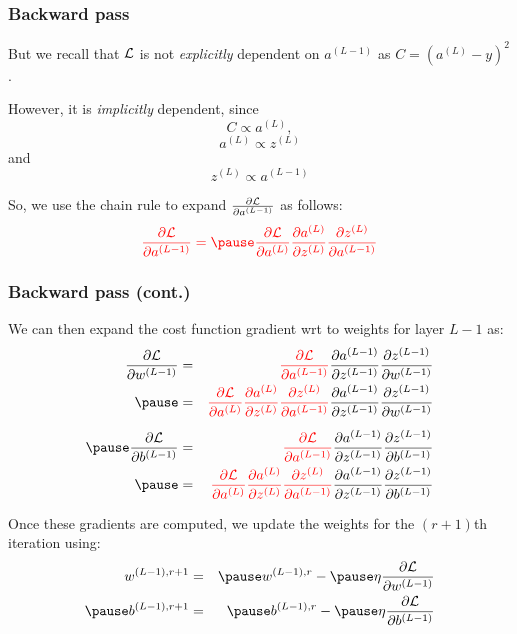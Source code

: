 \documentclass[smaller]{beamer}
\begin{document}
\begin{frame}
  \frametitle{Backward pass}
  \pause
  But we recall that $\mathcal{L}$ is not \textit{explicitly} dependent on $a^{(L-1)}$ as $C = (a^{(L)} - y)^2$.
  \pause

  However, it is \textit{implicitly} dependent, since\pause
  \begin{equation}
    C \propto a^{(L)},
  \end{equation}
  \pause
  \begin{equation}
    a^{(L)} \propto z^{(L)} 
  \end{equation}
  \pause
  and\pause
  \begin{equation}
    z^{(L)} \propto a^{(L-1)}
  \end{equation}
  \pause
  
  So, we use the chain rule to expand $\frac{\partial{\mathcal{L}}}{\partial{a^{(L-1)}}}$ as follows:\pause
  \begin{equation}\rd
    \pd{\mc{L}}{a^{(L-1)}} = \pause \pd{\mc{L}}{a^{(L)}}\pd{a^{(L)}}{z^{(L)}}\pd{z^{(L)}}{a^{(L-1)}}
  \end{equation}
\end{frame}

\begin{frame}
  \frametitle{Backward pass (cont.)}
  \pause
  We can then expand the cost function gradient wrt to weights for layer $L-1$ as:\pause
  \begin{eqnarray}
    \pd{\mc{L}}{w^{(L-1)}} &=& {\rd \pd{\mc{L}}{a^{(L-1)}}}\pd{a^{(L-1)}}{z^{(L-1)}}\pd{z^{(L-1)}}{w^{(L-1)}}
                          \\\pause
                        &=& {\rd \pd{\mc{L}}{a^{(L)}}\pd{a^{(L)}}{z^{(L)}}\pd{z^{(L)}}{a^{(L-1)}}} \pd{a^{(L-1)}}{z^{(L-1)}}\pd{z^{(L-1)}}{w^{(L-1)}} \\[2mm]\pause
    \pd{\mc{L}}{b^{(L-1)}} &=& {\rd \pd{\mc{L}}{a^{(L-1)}}}\pd{a^{(L-1)}}{z^{(L-1)}}\pd{z^{(L-1)}}{b^{(L-1)}}\\\pause                          
                           &=& {\rd \pd{\mc{L}}{a^{(L)}}\pd{a^{(L)}}{z^{(L)}}\pd{z^{(L)}}{a^{(L-1)}}} \pd{a^{(L-1)}}{z^{(L-1)}}\pd{z^{(L-1)}}{b^{(L-1)}} 
  \end{eqnarray}

  \pause

  Once these gradients are computed, we update the weights for the $(r+1)$th iteration using: \pause
   \begin{eqnarray}
    w^{(L-1), r+1}  &=& \pause  w^{(L-1),r} - \pause \eta \pd{\mc{L}}{w^{(L-1)}}  \\\pause
    b^{(L-1), r+1}  &=&  \pause b^{(L-1),r} - \pause \eta \pd{\mc{L}}{b^{(L-1)}}  
  \end{eqnarray}
\end{frame}
\end{document}
